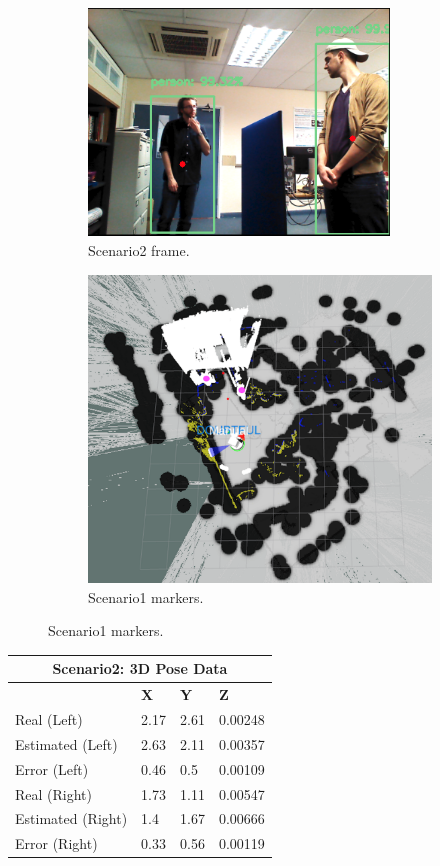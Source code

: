 \begin{figure}[H]
    \begin{subfigure}{.5\textwidth}
        \centering
        \includegraphics[width=8cm]{images/chapter6_scenario2.png}
        \caption{Scenario2 frame.}
	\end{subfigure}
    \begin{subfigure}{.5\textwidth}
        \centering
        \includegraphics[width=.9\linewidth]{images/chapter6_rviz_extend2.png}
        \caption{Scenario1 markers.}
        \label{2b}
	\end{subfigure}
\end{figure}

\begin{table}[H]
  \centering
  \begin{tabular}{ |p{4cm}|p{2cm}|p{2cm}|p{2cm}|  }
    \hline
    \multicolumn{4}{|c|}{Scenario2: 3D Pose Data} \\
    \hline
    & \textbf{X} & \textbf{Y} & \textbf{Z} \\
    \hline
    Real (Left) & 2.17 & 2.61 & 0.00248 \\
    Estimated (Left) & 2.63 & 2.11 & 0.00357 \\
    Error (Left) & 0.46 & 0.5 & 0.00109 \\
    \hline
    Real (Right) & 1.73 & 1.11 & 0.00547 \\
    Estimated (Right) & 1.4 & 1.67 & 0.00666 \\
    Error (Right) & 0.33 & 0.56 & 0.00119 \\
    \hline
  \end{tabular}
\end{table}

